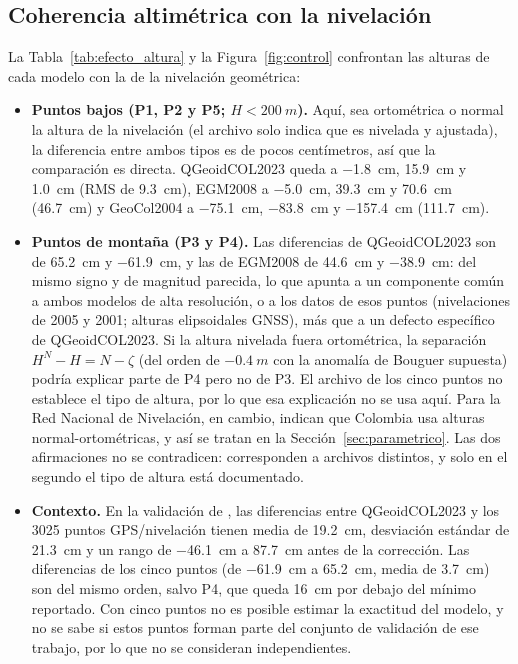 \documentclass[11pt,letterpaper]{article}
\begin{document}
\subsection{Coherencia altimétrica con la nivelación}
\label{sec:analisis_control}
La Tabla~\ref{tab:efecto_altura} y la Figura~\ref{fig:control} confrontan las alturas de cada modelo con la de
la nivelación geométrica:
\begin{itemize}
    \item \textbf{Puntos bajos (P1, P2 y P5; $H<\SI{200}{m}$).} Aquí, sea ortométrica o normal la altura de la nivelación (el archivo solo
    indica que es nivelada y ajustada), la diferencia entre ambos tipos es de pocos centímetros, así que la
    comparación es directa. QGeoidCOL2023 queda a
    \SI{-1.8}{cm}, \SI{+15.9}{cm} y \SI{+1.0}{cm} (RMS de \SI{9.3}{cm}), EGM2008 a
    \SI{-5.0}{cm}, \SI{+39.3}{cm} y \SI{+70.6}{cm} (\SI{46.7}{cm}) y GeoCol2004 a
    \SI{-75.1}{cm}, \SI{-83.8}{cm} y \SI{-157.4}{cm} (\SI{111.7}{cm}).
    
    \item \textbf{Puntos de montaña (P3 y P4).} Las diferencias de QGeoidCOL2023 son de \SI{+65.2}{cm} y
    \SI{-61.9}{cm}, y las de EGM2008 de \SI{+44.6}{cm} y \SI{-38.9}{cm}: del mismo signo y de magnitud
    parecida, lo que apunta a un componente común a ambos modelos de alta resolución, o a los datos de
    esos puntos (nivelaciones de 2005 y 2001; alturas elipsoidales GNSS), más que a un defecto
    específico de QGeoidCOL2023. Si la altura nivelada fuera ortométrica, la separación $H^N-H=N-\zeta$ (del orden de
    $-\SI{0.4}{m}$ con la anomalía de Bouguer supuesta) podría explicar parte de P4 pero no de P3. El
    archivo de los cinco puntos no establece el tipo de altura, por lo que esa explicación no se usa aquí.
    Para la Red Nacional de Nivelación, en cambio, \citet{guimaraes2025} indican que Colombia usa alturas
    normal-ortométricas, y así se tratan en la Sección~\ref{sec:parametrico}. Las dos afirmaciones no se
    contradicen: corresponden a archivos distintos, y solo en el segundo el tipo de altura está documentado.

    
    \item \textbf{Contexto.} En la validación de \citet{liu2024}, las diferencias entre
    QGeoidCOL2023 y los 3025 puntos GPS/nivelación tienen media de \SI{+19.2}{cm}, desviación estándar de
    \SI{21.3}{cm} y un rango de \SI{-46.1}{cm} a \SI{+87.7}{cm} antes de la corrección. Las diferencias de los cinco
    puntos (de \SI{-61.9}{cm} a \SI{+65.2}{cm}, media de \SI{+3.7}{cm}) son del mismo orden, salvo P4, que
    queda \SI{16}{cm} por debajo del mínimo reportado. Con cinco puntos no es posible estimar la exactitud
    del modelo, y no se sabe si estos puntos forman parte del conjunto de validación de ese trabajo, por lo que
    no se consideran independientes.
\end{itemize}
\end{document}
